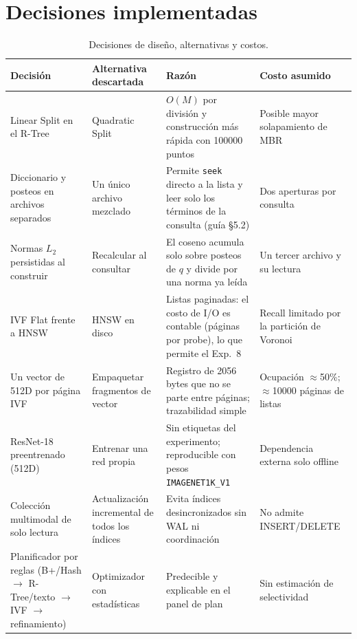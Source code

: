 \documentclass[11pt,a4paper]{article}
\newcommand{\code}[1]{\texttt{#1}}
\begin{document}
\section{Decisiones implementadas}\label{sec:dec}
\begin{table}[H]\centering\small
\begin{tabular}{@{}>{\raggedright\arraybackslash}p{3.1cm}>{\raggedright\arraybackslash}p{3.7cm}>{\raggedright\arraybackslash}p{4.2cm}>{\raggedright\arraybackslash}p{3.7cm}@{}}\toprule
Decisión & Alternativa descartada & Razón & Costo asumido\\\midrule
Linear Split en el R-Tree & Quadratic Split & $O(M)$ por división y construcción más rápida con 100000 puntos & Posible mayor solapamiento de MBR\\
Diccionario y posteos en archivos separados & Un único archivo mezclado & Permite \code{seek} directo a la lista y leer solo los términos de la consulta (guía §5.2) & Dos aperturas por consulta\\
Normas $L_2$ persistidas al construir & Recalcular al consultar & El coseno acumula solo sobre posteos de $q$ y divide por una norma ya leída & Un tercer archivo y su lectura\\
IVF Flat frente a HNSW & HNSW en disco & Listas paginadas: el costo de I/O es contable (páginas por probe), lo que permite el Exp.~8 & Recall limitado por la partición de Voronoi\\
Un vector de 512D por página IVF & Empaquetar fragmentos de vector & Registro de 2056 bytes que no se parte entre páginas; trazabilidad simple & Ocupación $\approx$50\%; $\approx$10000 páginas de listas\\
ResNet-18 preentrenado (512D) & Entrenar una red propia & Sin etiquetas del experimento; reproducible con pesos \code{IMAGENET1K\_V1} & Dependencia externa solo offline\\
Colección multimodal de solo lectura & Actualización incremental de todos los índices & Evita índices desincronizados sin WAL ni coordinación & No admite INSERT/DELETE\\
Planificador por reglas (B+/Hash $\rightarrow$ R-Tree/texto $\rightarrow$ IVF $\rightarrow$ refinamiento) & Optimizador con estadísticas & Predecible y explicable en el panel de plan & Sin estimación de selectividad\\\bottomrule
\end{tabular}\caption{Decisiones de diseño, alternativas y costos.}
\end{table}
\end{document}
